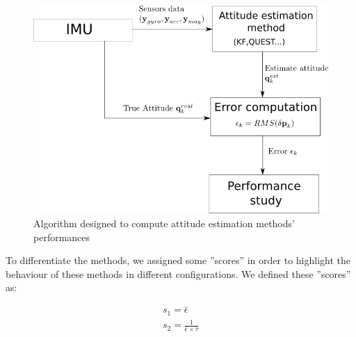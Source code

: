 \begin{figure}[!h]
\centering
\includegraphics[scale=0.40]{images/test_method.png}
\caption{Algorithm designed to compute attitude estimation methods' performances}
\label{test_method}
\end{figure}


To differentiate the methods, we assigned  some ''scores'' in order to highlight the behaviour of these methods in different configurations. We defined these ''scores'' as:

\begin{align}
s_1 = \bar{\epsilon}\\
s_2 = \frac{1}{\bar{\epsilon} \times \bar{\tau}}
\label{score}
\end{align}

